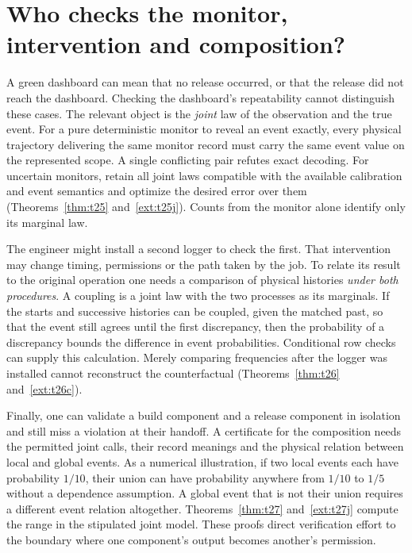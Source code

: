 \section{Who checks the monitor, intervention and composition?}\label{sec:verify}
A green dashboard can mean that no release occurred, or that the release did not reach the dashboard. Checking the dashboard's repeatability cannot distinguish these cases. The relevant object is the \emph{joint} law of the observation and the true event. For a pure deterministic monitor to reveal an event exactly, every physical trajectory delivering the same monitor record must carry the same event value on the represented scope. A single conflicting pair refutes exact decoding. For uncertain monitors, retain all joint laws compatible with the available calibration and event semantics and optimize the desired error over them (Theorems~\ref{thm:t25} and~\ref{ext:t25j}). Counts from the monitor alone identify only its marginal law.

The engineer might install a second logger to check the first. That intervention may change timing, permissions or the path taken by the job. To relate its result to the original operation one needs a comparison of physical histories \emph{under both procedures}. A coupling is a joint law with the two processes as its marginals. If the starts and successive histories can be coupled, given the matched past, so that the event still agrees until the first discrepancy, then the probability of a discrepancy bounds the difference in event probabilities. Conditional row checks can supply this calculation. Merely comparing frequencies after the logger was installed cannot reconstruct the counterfactual (Theorems~\ref{thm:t26} and~\ref{ext:t26c}).

Finally, one can validate a build component and a release component in isolation and still miss a violation at their handoff. A certificate for the composition needs the permitted joint calls, their record meanings and the physical relation between local and global events. As a numerical illustration, if two local events each have probability \(1/10\), their union can have probability anywhere from \(1/10\) to \(1/5\) without a dependence assumption. A global event that is not their union requires a different event relation altogether. Theorems~\ref{thm:t27} and~\ref{ext:t27j} compute the range in the stipulated joint model. These proofs direct verification effort to the boundary where one component's output becomes another's permission.
